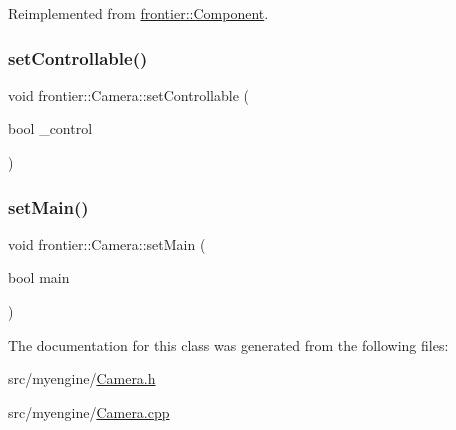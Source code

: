 Reimplemented from \hyperlink{classfrontier_1_1_component_ab920f9bc07ce051ebb5559c5a66508d1}{frontier\+::\+Component}.

\mbox{\label{classfrontier_1_1_camera_ab1872f3ceccbb6dcfa4fcf043f0eb5f8}} 
\subsubsection{\texorpdfstring{set\+Controllable()}{setControllable()}}
{\footnotesize\ttfamily void frontier\+::\+Camera\+::set\+Controllable (\begin{DoxyParamCaption}\item[{bool}]{\+\_\+control }\end{DoxyParamCaption})}

\mbox{\label{classfrontier_1_1_camera_ae8a9b95bf6e4eacdae709d188725e72a}} 
\subsubsection{\texorpdfstring{set\+Main()}{setMain()}}
{\footnotesize\ttfamily void frontier\+::\+Camera\+::set\+Main (\begin{DoxyParamCaption}\item[{bool}]{main }\end{DoxyParamCaption})}



The documentation for this class was generated from the following files\+:\begin{DoxyCompactItemize}
\item 
src/myengine/\hyperlink{_camera_8h}{Camera.\+h}\item 
src/myengine/\hyperlink{_camera_8cpp}{Camera.\+cpp}\end{DoxyCompactItemize}
